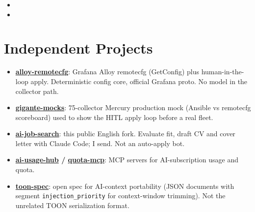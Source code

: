\documentclass[11pt,a4paper,sans]{moderncv}
\begin{document}
\begin{itemize}
\vspace{3pt}

\item{}

\vspace{3pt}

\item{}

\end{itemize}


\section{Independent Projects}
\vspace{1pt}
\begin{itemize}
\item \textbf{\href{https://github.com/carl0sfelipe/alloy-remotecfg}{alloy-remotecfg}}: Grafana Alloy remotecfg (GetConfig) plus human-in-the-loop apply. Deterministic config core, official Grafana proto. No model in the collector path.
\item \textbf{\href{https://github.com/carl0sfelipe/gigante-mocks}{gigante-mocks}}: 75-collector Mercury production mock (Ansible vs remotecfg scoreboard) used to show the HITL apply loop before a real fleet.
\item \textbf{\href{https://github.com/carl0sfelipe/ai-job-search}{ai-job-search}}: this public English fork. Evaluate fit, draft CV and cover letter with Claude Code; I send. Not an auto-apply bot.
\item \textbf{\href{https://github.com/carl0sfelipe/ai-usage-hub}{ai-usage-hub} / \href{https://github.com/carl0sfelipe/quota-mcp}{quota-mcp}}: MCP servers for AI-subscription usage and quota.
\item \textbf{\href{https://github.com/carl0sfelipe/toon-spec}{toon-spec}}: open spec for AI-context portability (JSON documents with segment \texttt{injection\_priority} for context-window trimming). Not the unrelated TOON serialization format.
\end{itemize}
\end{document}
